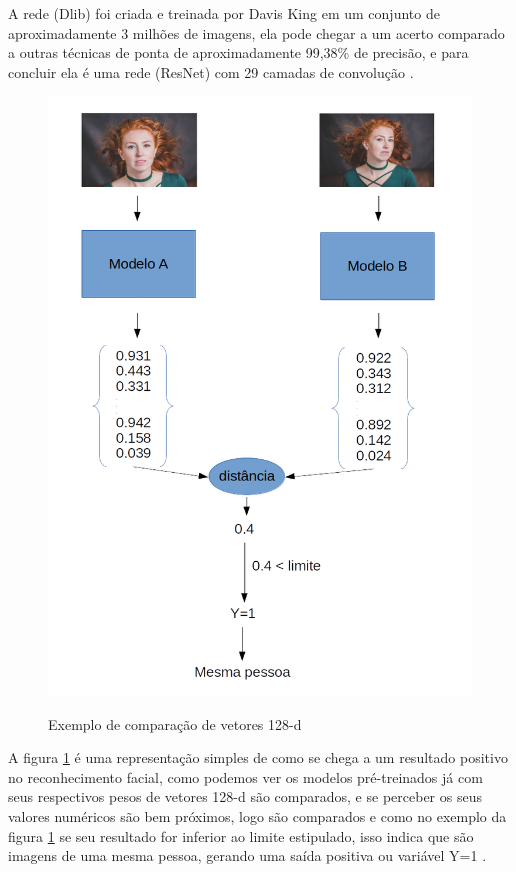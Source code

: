 A rede (Dlib) foi criada e treinada por Davis King em um conjunto de aproximadamente 3 milhões de imagens, ela pode chegar a um acerto comparado a outras técnicas de ponta de aproximadamente 99,38\% de precisão, e para concluir ela é uma rede (ResNet) com 29 camadas de convolução \cite{dlib1}.
\begin{figure}[htpb]
  \centering
  \caption{Exemplo de comparação de vetores 128-d}
  \includegraphics[scale=.5]{figs/gfdg.png}
  \label{fig:exetrein}
\end{figure}

A figura \ref{fig:exetrein} é uma representação simples de como se chega a um resultado positivo no reconhecimento facial, como podemos ver os modelos pré-treinados já com seus respectivos pesos de vetores 128-d são comparados, e se perceber os seus valores numéricos são bem próximos, logo são comparados e como no exemplo da figura \ref{fig:exetrein} se seu resultado for inferior ao limite estipulado, isso indica que são imagens de uma mesma pessoa, gerando uma saída positiva ou variável Y=1 \cite{adamgeitgey}.

